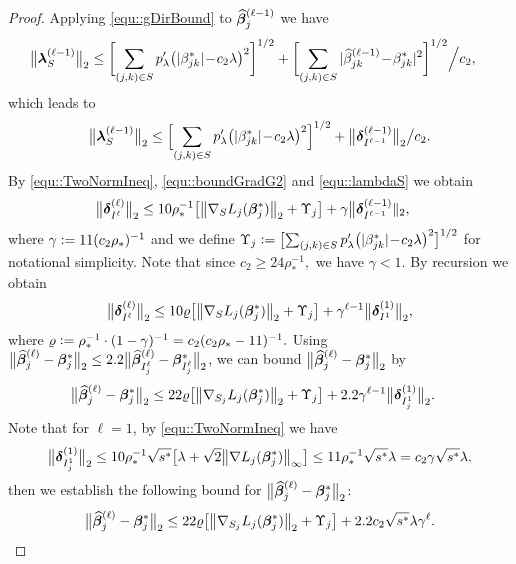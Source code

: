 \documentclass[twoside,11pt]{article}
\newcommand{\defeq}{\vcentcolon=}
\newcommand*{\hbbeta}{\hat{\bbeta}}
\newcommand*{\bbetas}{\bbeta^*}
\newcommand*{\hbbetas}{\hat{\bbeta}_{j}}
\newcommand*{\bbetass}{\bbeta^*_{j}}
\begin{document}
\begin{proof}
Applying \eqref{equ::gDirBound} to $\hbbetas^{(\ell-1)}$ we have
\begin{align*}
\big\|\bm{\lambda}_{S}^{(\ell-1)}\big\|_2 &\leq \biggl[\sum\limits_{{(j,k)}\in S} p_{\lambda}'\bigl(|\beta_{jk}^*| \!-\! c_2\lambda\bigr)^2 \biggr]^{1/2} + \biggl[\sum\limits_{(j,k)\in S} |\widehat\beta_{jk} ^{(\ell-1)}\!- \!\beta_{jk}^*|^2 \biggr]^{1/2}\Big/c_2,
\end{align*} 
which leads to 
\begin{align}\label{equ::lambdaS}
\big\|\bm{\lambda}_S^{(\ell-1)}\big\|_2 \leq \Bigl[\sum\limits_{{(j,k)}\in S} p_{\lambda}'\bigl(|\beta_{jk}^*| \!-\! c_2\lambda\bigr)^2 \Bigr]^{1/2} +   \bigl \| \bm{\delta}^{(\ell-1)}_{I^{\ell-1}}\bigr\|_2\big/c_2 .
\end{align} 
By  \eqref{equ::TwoNormIneq}, \eqref{equ::boundGradG2} and \eqref{equ::lambdaS} we  obtain 
\begin{align*}
\bigl \| \bdelta^{(\ell)}_{I^{\ell}} \bigr \|_2 &\leq  10\rho_*^{-1}\bigl[ \big\|\nabla_{S} L_j(\bbetas_j)\big\|_2  +\Upsilon_j  \bigr]+ \gamma \bigl \| \bdelta^{(\ell-1)}_{I^{\ell-1}}\|_2 , 
\end{align*}
where  $\gamma \defeq 11 (c_2\rho_*)^{-1}$ and we define $\Upsilon_j \defeq\bigl[\sum_{{(j,k)}\in S} p_{\lambda}'\bigl(|\beta_{jk}^*| \!-\! c_2\lambda\bigr)^2 \bigr]^{1/2}$ for notational simplicity.
Note that since $c_2 \geq 24\rho_*^{-1},$ we have $\gamma < 1.$ By  recursion we obtain
\begin{align}\label{equ::RecursionIk}
\bigl \| \bdelta_{I^{\ell}}^{(\ell)}\bigr \|_2 \leq 10\varrho\bigl[ \big\|\nabla_{S} L_j(\bbetas_j)\big\|_2  +\Upsilon_j \bigr]+\gamma^{\ell-1} \bigl \| \bdelta_{I^1}^{(1)}\bigr \|_2,
\end{align}
where $\varrho \defeq \rho_*^{-1}\cdot(1-\gamma)^{-1} = c_2 (c_2 \rho_* - 11)^{-1}.$
Using  $\bigl \| \hbbetas^{(\ell)} - \bbetass \bigr \|_2 \leq 2.2 \bigl \| \hbbeta_{I_j^{\ell}}^{(\ell)} - \bbetas_{I_j^{\ell}} \bigr \|_2$,  we can bound $\bigl \| \hbbetas^{(\ell)} - \bbetass \bigr \|_2$ by 
\begin{align*}
\bigl \| \hbbetas^{(\ell)} - \bbetass \bigr \|_2 & \leq 22\varrho\bigl[ \big\|\nabla_{S_j} L_j(\bbetas_j)\big\|_2  +\Upsilon_j \bigr] +2.2 \gamma^{\ell -1} \bigl \| \bdelta_{I_j^1}^{(1)}\bigr \|_2.
\end{align*}
Note that for $\ell=1$, by \eqref{equ::TwoNormIneq} we have 
\begin{align}\label{equ::InitialTwoNorm}
\bigl \| \bdelta_{I_j^1}^{(1)}\bigr \|_2 \leq  10 \rho_{*}^{-1} \sqrt{s^*} \big[\lambda  + \sqrt{2}\bigl \| \nabla L_j(\bbetas_j)\bigr\|_{\infty} \bigr]\leq11 \rho_*^{-1}\sqrt{s^*}\lambda =  c_2 \gamma\sqrt{s^*}\lambda.
\end{align}
then we establish the following bound for $\bigl \| \hbbetas^{(\ell)} - \bbetass \bigr \|_2\colon$
\begin{align}\label{equ::FinalL2Rate}
\bigl \| \hbbetas^{(\ell)} - \bbetass \bigr \|_2 \leq  22\varrho\bigl[ \big\|\nabla_{S_j} L_j(\bbetas_j)\big\|_2  +\Upsilon_j  \bigr] + 2.2c_2\sqrt{s^*} \lambda \gamma^{\ell} .
\end{align}


\end{proof}
\end{document}
